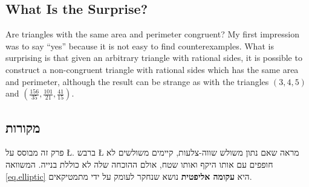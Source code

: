 \subsection*{What Is the Surprise?}

Are triangles with the same area and perimeter congruent? My first impression was to say ``yes'' because it is not easy to find counterexamples. What is surprising is that given an arbitrary triangle with rational sides, it is possible to construct a non-congruent triangle with rational sides which has the same area and perimeter, although the result can be strange as with the triangles $(3,4,5)$ and $\left(\frac{156}{35}, \frac{101}{21}, \frac{41}{15}\right)$.


\subsection*{מקורות}

פרק זה מבוסס על 
\L{\cite{mccallum}}.
ברבש
\L{\cite{marita}}
מראה שאם נתון משולש שווה-צלעות, קיימים משולשים לא חופפים עם אותו היקף ואותו שטח, אולם ההוכחה שלה לא כוללת בנייה. 
המשוואה~%
\ref{eq.elliptic}
היא
\textbf{עקומה אליפטית}
נושא שנחקר לעומק על ידי מתמטיקאים.
